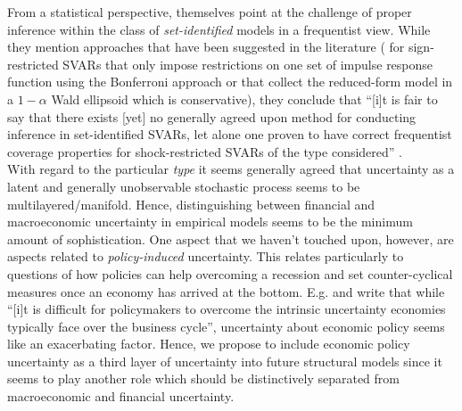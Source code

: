 \documentclass[a4paper,11pt,listof=nochaptergap,oneside,pointednumbers,bibtotoc,bigheadings,liststotoc,hidelinks]{scrbook}
\theoremstyle{mysatz}
\theoremstyle{mydefinition}
\theoremstyle{mytheorem}
\theoremstyle{mybemerkung}
\begin{document}
From a statistical perspective, \citet{ludvigsonetal:18} themselves point at the challenge of proper inference within the class of \textit{set-identified} models in a frequentist view. While they mention approaches that have been suggested in the literature (\citet{granzieraetal:18} for sign-restricted SVARs that only impose restrictions on one set of impulse response function using the Bonferroni approach or \citet{gafarovetal:15} that collect the reduced-form model in a $1-\alpha$ Wald ellipsoid which is conservative), they conclude that ``[i]t is fair to say that there exists [yet] no generally agreed upon method for conducting inference in set-identified SVARs, let alone one proven to have correct frequentist coverage properties for shock-restricted SVARs of the type considered'' \citep[p. 10]{ludvigsonetal:17}. \\

With regard to the particular \textit{type} it seems generally agreed that uncertainty as a latent and generally unobservable stochastic process seems to be multilayered/manifold. Hence, distinguishing between financial and macroeconomic uncertainty in empirical models seems to be the minimum amount of sophistication. One aspect that we haven't touched upon, however, are aspects related to \textit{policy-induced} uncertainty. This relates particularly to questions of how policies can help overcoming a recession and set counter-cyclical measures once an economy has arrived at the bottom. E.g. \citet[p. 41]{bloometal:13} and \citet{IMF:12} write that while ``[i]t is difficult for policymakers to overcome the intrinsic uncertainty economies typically face over the business cycle'', uncertainty about economic policy seems like an exacerbating factor. Hence, we propose to include economic policy uncertainty as a third layer of uncertainty into future structural models since it seems to play another role which should be distinctively separated from macroeconomic and financial uncertainty. \\
\end{document}
